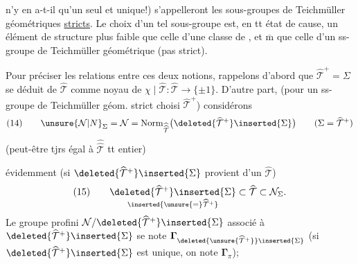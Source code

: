 
n'y en a-t-il qu'un seul et unique!) s'appelleront les sous-groupes de Teichmüller géométriques \uline{stricts}. Le choix d'un tel sous-groupe  est, en tt état de cause, un élément de structure  plus faible que celle d'une classe de , et $\overline{\mathrm m}$ que celle d'un ss-groupe de Teichmüller géométrique (pas strict).

Pour préciser les relations entre ces deux notions, rappelons d'abord que $\widehat{\mathcal{T}}^{+}=\Sigma$ se déduit de $\widehat{\mathcal{T}}$ comme noyau de $\chi\mid\widehat{\mathcal{T}}:\widehat{\mathcal{T}}\longrightarrow\{\pm1\}$. D'autre part,  (pour un ss-groupe de Teichmüller géom. strict choisi $\widehat{\mathcal{T}}^{+}$) considérons
\[
(14)\qquad
\unsure{\mathcal{N}|N}_{\Sigma}=\mathcal{N}
=\operatorname{Norm}_{\widehat{\widehat{\mathcal{T}}}}
\bigl(\deleted{\widehat{\mathcal{T}}^{+}}\inserted{\Sigma}\bigr)
\qquad (\Sigma=\widehat{\mathcal{T}}^{+})
\]
(peut-être tjrs égal à $\widehat{\widehat{\mathcal{T}}}$ tt entier)

évidemment (si $\deleted{\widehat{\mathcal{T}}^{+}}\inserted{\Sigma}$ provient d'un $\widehat{\mathcal{T}}$)
\[
(15)\qquad
\underset{\inserted{\unsure{=}\widehat{\mathcal{T}}^{+}}}
{\deleted{\widehat{\mathcal{T}}^{+}}\inserted{\Sigma}}
\subset\widehat{\mathcal{T}}\subset\mathcal{N}_{\Sigma}.
\]
Le groupe profini $\mathcal{N}/\deleted{\widehat{\mathcal{T}}^{+}}\inserted{\Sigma}$
 associé à 
$\deleted{\widehat{\mathcal{T}}^{+}}\inserted{\Sigma}$ se note
$\boldsymbol{\Gamma}_{\deleted{\unsure{\widehat{\mathcal{T}}^{+}}}\inserted{\Sigma}}$
 
(si $\deleted{\widehat{\mathcal{T}}^{+}}\inserted{\Sigma}$ est unique, on note $\boldsymbol{\Gamma}_{\pi}$);


